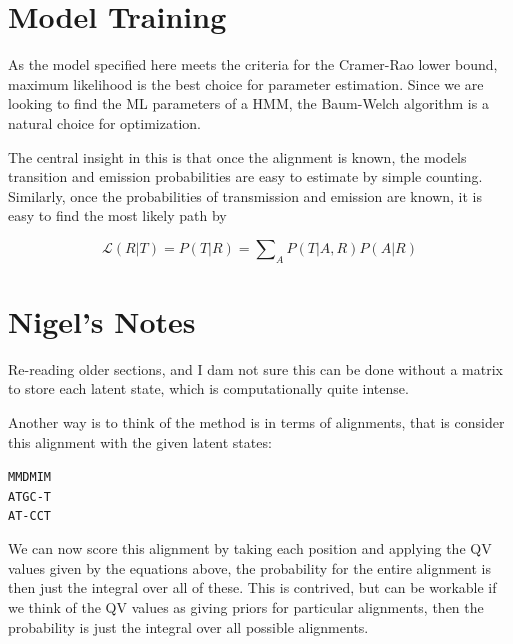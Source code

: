 \documentclass[fleqn,10pt]{SelfArx} %
\begin{document}
\section{Model Training}

As the model specified here meets the criteria for the Cramer-Rao lower bound, maximum likelihood is the best choice for parameter estimation.  Since we are looking to find the ML parameters of a HMM, the Baum-Welch algorithm is a natural choice for optimization.

The central insight in this is that once the alignment is known, the models transition and emission probabilities are easy to estimate by simple counting.  Similarly, once the probabilities of transmission and emission are known, it is easy to find the most likely path by 

\begin{dmath}
\mathcal{L}  (R|T) = P(T|R) = \sum\nolimits_{A} P(T|A,R)P(A|R)
\end{dmath}
\section{Nigel's Notes}

Re-reading older sections, and I dam not sure this can be done without a matrix to store each latent state, which is computationally quite intense.

Another way is to think of the method is in terms of alignments, that is consider this alignment with the given latent states: 

 \begin{center}
 \texttt{MMDMIM}\\
\texttt{ATGC-T}\\
\texttt{AT-CCT}
\end{center}

We can now score this alignment by taking each position and applying the QV values given by the equations above, the probability for the entire alignment is then just the integral over all of these.  This is contrived, but can be workable if we think of the QV values as giving priors for particular alignments, then the probability is just the integral over all possible alignments.

\end{document}
